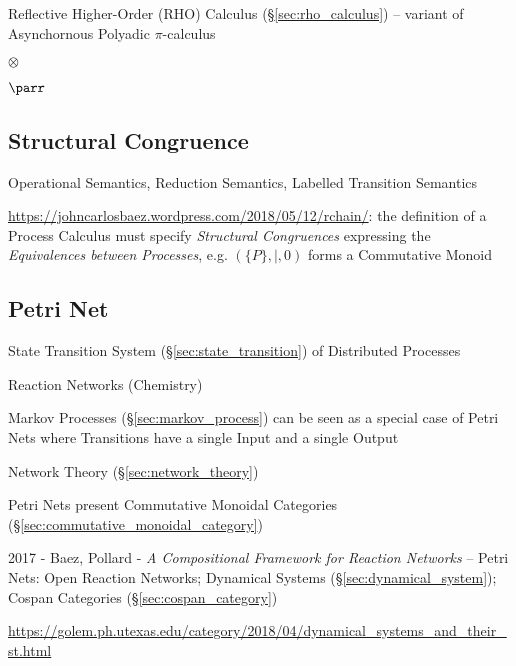 \fist Reflective Higher-Order (RHO) Calculus (\S\ref{sec:rho_calculus}) --
variant of Asynchornous Polyadic $\pi$-calculus


$\otimes$

$\parr$



\subsection{Structural Congruence}\label{sec:structural_congruence}

Operational Semantics, Reduction Semantics, Labelled Transition Semantics

\url{https://johncarlosbaez.wordpress.com/2018/05/12/rchain/}: the definition
of a Process Calculus must specify \emph{Structural Congruences} expressing the
\emph{Equivalences between Processes}, e.g. $(\{P\},|,0)$ forms a Commutative
Monoid



\subsection{Petri Net}\label{sec:petri_net}

State Transition System (\S\ref{sec:state_transition}) of Distributed
Processes

Reaction Networks (Chemistry)

Markov Processes (\S\ref{sec:markov_process}) can be seen as a special
case of Petri Nets where Transitions have a single Input and a single
Output

\fist Network Theory (\S\ref{sec:network_theory})

Petri Nets present Commutative Monoidal Categories
(\S\ref{sec:commutative_monoidal_category})

2017 - Baez, Pollard - \emph{A Compositional Framework for Reaction Networks}
-- Petri Nets: Open Reaction Networks; Dynamical Systems
(\S\ref{sec:dynamical_system}); Cospan Categories (\S\ref{sec:cospan_category})

\url{https://golem.ph.utexas.edu/category/2018/04/dynamical_systems_and_their_st.html}



